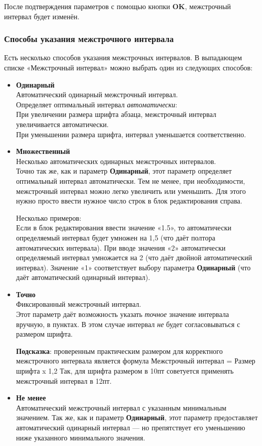 \documentclass[a4paper,10pt]{article}
\begin{document}
После подтверждения параметров с помощью кнопки \textbf{OK}, межстрочный интервал будет изменён.

\subsubsection{Способы указания межстрочного интервала}
Есть несколько способов указания межстрочных интервалов. В выпадающем списке «Межстрочный интервал» можно выбрать один из следующих способов:
\begin{itemize}
 \item \textbf{Одинарный}\\
 Автоматический одинарный межстрочный интервал.\\
Определяет оптимальный интервал \textit{автоматически}:\\
При увеличении размера шрифта абзаца,  межстрочный интервал увеличивается автоматически.\\
При уменьшении размера шрифта, интервал уменьшается соответственно.
\item \textbf{Множественный}\\
Несколько автоматических одинарных межстрочных интервалов.\\
Точно так же, как и параметр \textbf{Одинарный}, этот параметр определяет оптимальный интервал автоматически. Тем не менее, при необходимости, межстрочный интервал можно легко увеличить или уменьшить. Для этого нужно просто ввести нужное число строк в блок редактирования справа.

Несколько примеров:\\
Если в блок редактирования ввести значение «1.5», то автоматически определяемый интервал будет умножен на 1,5 (что даёт полтора автоматических интервала).
При вводе значения «2» автоматически определяемый интервал умножается на 2 (что даёт двойной автоматический интервал).
Значение «1» соответствует выбору параметра \textbf{Одинарный} (что даёт автоматический одинарный интервал).
\item \textbf{Точно}\\
Фиксированный межстрочный интервал.\\
Этот параметр даёт возможность указать \textit{точное} значение интервала вручную, в пунктах. В этом случае интервал \textit{не} будет согласовываться с размером шрифта.

\textbf{Подсказка}: проверенным практическим размером для корректного межстрочного интервала является формула Межстрочный интервал = Размер шрифта x 1,2
Так, для шрифта размером в 10пт советуется применять межстрочный интервал в 12пт.
\item \textbf{Не менее}\\
Автоматический межстрочный интервал с указанным минимальным значением.
Так же, как и параметр \textbf{Одинарный}, этот параметр предоставляет автоматический одинарный интервал --- но препятствует его уменьшению ниже указанного минимального значения.


\end{itemize}
\end{document}
